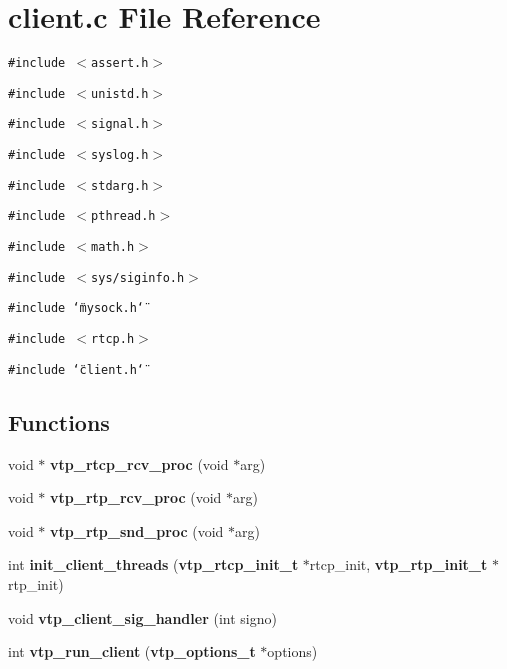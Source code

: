 \section{client.c File Reference}
\label{client_8c}
{\tt \#include $<$assert.h$>$}\par
{\tt \#include $<$unistd.h$>$}\par
{\tt \#include $<$signal.h$>$}\par
{\tt \#include $<$syslog.h$>$}\par
{\tt \#include $<$stdarg.h$>$}\par
{\tt \#include $<$pthread.h$>$}\par
{\tt \#include $<$math.h$>$}\par
{\tt \#include $<$sys/siginfo.h$>$}\par
{\tt \#include \char`\"{}mysock.h\char`\"{}}\par
{\tt \#include $<$rtcp.h$>$}\par
{\tt \#include \char`\"{}client.h\char`\"{}}\par
\subsection*{Functions}
\begin{CompactItemize}
\item 
void $\ast$ {\bf vtp\_\-rtcp\_\-rcv\_\-proc} (void $\ast$arg)
\item 
void $\ast$ {\bf vtp\_\-rtp\_\-rcv\_\-proc} (void $\ast$arg)
\item 
void $\ast$ {\bf vtp\_\-rtp\_\-snd\_\-proc} (void $\ast$arg)
\item 
int {\bf init\_\-client\_\-threads} ({\bf vtp\_\-rtcp\_\-init\_\-t} $\ast$rtcp\_\-init, {\bf vtp\_\-rtp\_\-init\_\-t} $\ast$rtp\_\-init)
\item 
void {\bf vtp\_\-client\_\-sig\_\-handler} (int signo)
\item 
int {\bf vtp\_\-run\_\-client} ({\bf vtp\_\-options\_\-t} $\ast$options)
\end{CompactItemize}
